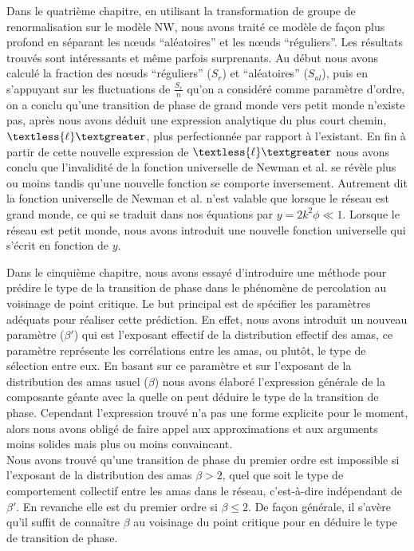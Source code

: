 Dans le quatrième chapitre, en utilisant la transformation de groupe de renormalisation sur le modèle NW, nous avons traité ce modèle de façon plus profond en séparant les nœuds ``aléatoires'' et les nœuds ``réguliers''. Les résultats trouvés sont intéressants et même parfois surprenants. Au début nous avons calculé la fraction des nœuds ``réguliers''  ($S_r$) et ``aléatoires'' ($S_{al}$), puis en s'appuyant sur les fluctuations de $\frac {S_r}{n}$ qu'on a considéré comme paramètre d'ordre, on a conclu qu'une transition de phase de grand monde vers petit monde n'existe pas, après nous avons déduit une expression analytique du plus court chemin, $\textless {\ell} \textgreater$, plus perfectionnée par rapport à l'existant. En fin à partir de cette nouvelle expression de $\textless {\ell} \textgreater$ nous avons conclu que l'invalidité de la fonction universelle de Newman et al. \cite{Newman-Watts1999-2} se révèle  plus ou moins tandis qu'une nouvelle fonction se comporte inversement. Autrement dit la fonction universelle de Newman et al. \cite{Newman-Watts1999-2} n'est valable que lorsque le réseau est grand monde, ce qui se traduit dans nos équations par $y=2k^2\phi \ll 1$. Lorsque le réseau est petit monde, nous avons introduit une nouvelle fonction universelle qui s'écrit en fonction de $y$.


Dans le cinquième chapitre, nous avons essayé d'introduire une méthode pour prédire le type de la transition de phase dans le phénomène de percolation au voisinage de point critique. Le but principal est de spécifier les paramètres adéquats pour réaliser cette prédiction. En effet, nous avons introduit un nouveau paramètre ($\beta'$) qui est l'exposant  effectif de la distribution effectif des amas, ce paramètre représente les corrélations entre les amas, ou plutôt, le type de sélection entre eux. En basant sur ce paramètre et  sur l'exposant de la distribution des amas usuel ($\beta$) nous avons élaboré l'expression générale de la composante géante avec la quelle on peut déduire le type de la transition de phase. Cependant l'expression trouvé n'a pas une forme explicite pour le moment, alors nous avons obligé de faire appel aux approximations et aux arguments moins solides mais plus ou moins convaincant. \\
Nous avons trouvé qu'une transition de phase du premier ordre est impossible si l'exposant de la distribution des amas $\beta>2$, quel que soit le type de comportement collectif entre les amas  dans le réseau, c'est-à-dire indépendant de $\beta'$. En revanche elle est du premier ordre si $\beta\leq2$. De façon générale, il s'avère qu'il suffit de connaître $\beta$ au voisinage du point critique pour en déduire le type de transition de phase.\\ 